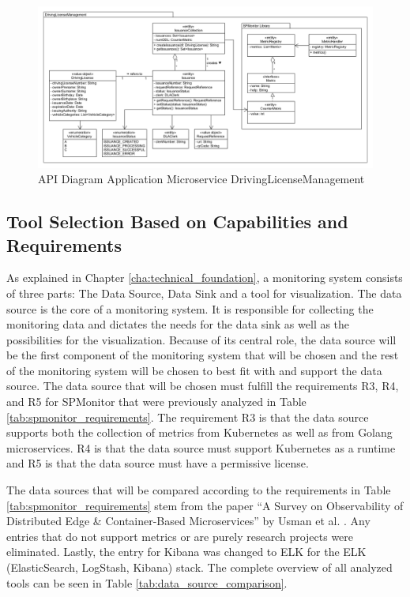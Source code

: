 \begin{figure}[tb]
  \centering
  \includegraphics[width=\textwidth]{figures/6.3_api_diagram_drivinglicensemanagement.png}
  \caption{API Diagram Application Microservice DrivingLicenseManagement}
  \label{fig:api_diagram_drivinglicensemanagement}
\end{figure}

\subsection{Tool Selection Based on Capabilities and Requirements}

As explained in Chapter \ref{cha:technical_foundation}, a monitoring system
consists of three parts: The Data Source, Data Sink and a tool for
visualization. The data source is the core of a monitoring system. It is
responsible for collecting the monitoring data and dictates the needs for the
data sink as well as the possibilities for the visualization. Because of its
central role, the data source will be the first component of the monitoring
system that will be chosen and the rest of the monitoring system will be chosen
to best fit with and support the data source. The data source that will be
chosen must fulfill the requirements R3, R4, and R5 for SPMonitor that were
previously analyzed in Table \ref{tab:spmonitor_requirements}. The requirement
R3 is that the data source supports both the collection of metrics from
Kubernetes as well as from Golang microservices. R4 is that the data source
must support Kubernetes as a runtime and R5 is that the data source must have a
permissive license.

The data sources that will be compared according to the requirements in Table
\ref{tab:spmonitor_requirements} stem from the paper \enquote{A Survey on Observability of Distributed Edge {\&} Container-Based Microservices} by Usman
et al. \cite{UF+22}. Any entries that do not support metrics or are purely
research projects were eliminated. Lastly, the entry for Kibana was changed to
ELK for the ELK (ElasticSearch, LogStash, Kibana) stack. The complete overview
of all analyzed tools can be seen in Table \ref{tab:data_source_comparison}.

